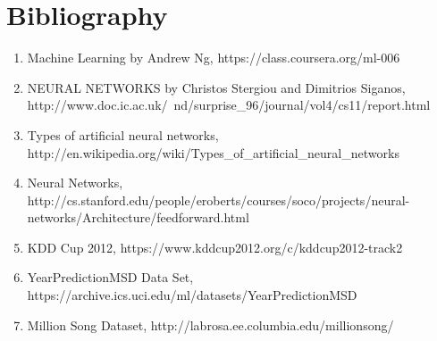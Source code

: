 \documentclass[10pt]{article}
\begin{document}
\section{Bibliography}
\begin{enumerate}
	\item Machine Learning by Andrew Ng, https://class.coursera.org/ml-006
	\item NEURAL NETWORKS by Christos Stergiou and Dimitrios Siganos, \\http://www.doc.ic.ac.uk/~nd/surprise\_96/journal/vol4/cs11/report.html
	\item Types of artificial neural networks, http://en.wikipedia.org/wiki/Types\_of\_artificial\_neural\_networks
	\item Neural Networks, \\http://cs.stanford.edu/people/eroberts/courses/soco/projects/neural-networks/Architecture/feedforward.html
	\item KDD Cup 2012, https://www.kddcup2012.org/c/kddcup2012-track2
	\item YearPredictionMSD Data Set, https://archive.ics.uci.edu/ml/datasets/YearPredictionMSD
	\item Million Song Dataset, http://labrosa.ee.columbia.edu/millionsong/
\end{enumerate}
	

\nocite{*}		

		
\end{document}
